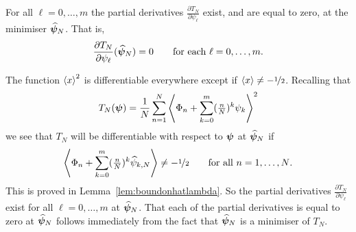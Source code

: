 \documentclass[journal]{IEEEtran}
\begin{document}
\begin{lemma}\label{lem:diffathatpsi}
For all $\ell = 0, \dots, m$ the partial derivatives $\frac{\partial T_N}{\partial \psi_\ell}$ exist, and are equal to zero, at the minimiser $\widehat{\boldsymbol{\psi}}_N$.  That is,
\[
\frac{\partial T_N}{\partial \psi_\ell}(\widehat{\boldsymbol{\psi}}_N) = 0 \qquad \text{for each $\ell = 0, \dots, m$.}
\]
\end{lemma}
\begin{IEEEproof}
The function $\left\langle x \right\rangle^2$ is differentiable everywhere except if $\left\langle x \right\rangle \neq -\nicefrac{1}{2}$.  Recalling that
\[
T_{N}(\boldsymbol{\psi}) = \frac{1}{N} \sum_{n=1}^{N} \left\langle  \Phi_n + \sum_{k=0}^m (\tfrac{n}{N})^k \psi_k  \right\rangle^2
\]
we see that $T_N$ will be differentiable with respect to $\boldsymbol{\psi}$ at $\widehat{\boldsymbol{\psi}}_N$ if 
\[
\left\langle \Phi_n + \sum_{k=0}^m (\tfrac{n}{N})^k \widehat{\psi}_{k,N} \right\rangle \neq -\nicefrac{1}{2} \qquad \text{for all $n = 1, \dots, N$.}
\] 
This is proved in Lemma~\ref{lem:boundonhatlambda}.  So the partial derivatives $\frac{\partial T_N}{\partial \psi_\ell}$ exist for all $\ell = 0, \dots, m$ at $\widehat{\boldsymbol{\psi}}_N$.  That each of the partial derivatives is equal to zero at $\widehat{\boldsymbol{\psi}}_N$ follows immediately from the fact that $\widehat{\boldsymbol{\psi}}_N$ is a minimiser of $T_N$.
\end{IEEEproof}
\end{document}
